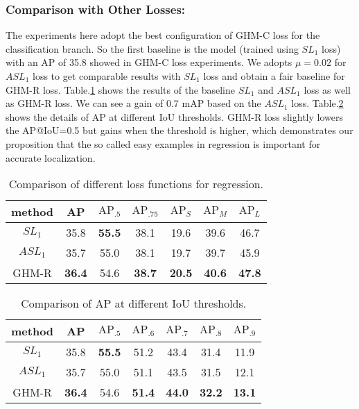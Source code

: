 \documentclass[letterpaper]{article} \usepackage{aaai19}  \usepackage{times}  \usepackage{helvet}  \usepackage{courier}  \usepackage{url}  \usepackage{graphicx}  \usepackage{amsmath,amssymb}
\begin{document}
\subsubsection{Comparison with Other Losses:} The experiments here adopt the best configuration of GHM-C loss for the classification branch. So the first baseline is the model (trained using $SL_1$ loss) with an AP of 35.8 showed in GHM-C loss experiments. We adopts $\mu=0.02$ for $ASL_1$ loss to get comparable results with $SL_1$ loss and obtain a fair baseline for GHM-R loss. Table.\ref{tab:reg1} shows the results of the baseline $SL_1$ and $ASL_1$ loss as well as  GHM-R loss. We can see a gain of 0.7 mAP based on the $ASL_1$ loss. Table.\ref{tab:regthr} shows the details of AP at different IoU thresholds.  GHM-R loss slightly lowers the AP@IoU=0.5 but gains when the threshold is higher, which demonstrates our proposition that the so called easy examples in regression is important for accurate localization.
\begin{table}[!ht]
\begin{center}
\begin{tabular}{| c | c  c  c  c  c  c |}
\hline
method & AP & $\text{AP}_{.5}$ & $\text{AP}_{.75}$ & $\text{AP}_{S}$ & $\text{AP}_{M}$ & $\text{AP}_{L}$ \\
\hline
$SL_1$ & 35.8 & \textbf{55.5} & 38.1 & 19.6 & 39.6 & 46.7 \\
$ASL_1$ & 35.7 & 55.0 & 38.1 & 19.7 & 39.7 & 45.9 \\
GHM-R & \textbf{36.4} & 54.6 & \textbf{38.7} & \textbf{20.5} & \textbf{40.6} & \textbf{47.8} \\
\hline 
\end{tabular}
\caption{Comparison of different loss functions for regression.}
\label{tab:reg1}
\end{center}
\end{table}

\begin{table}[!ht]
\begin{center}
\begin{tabular}{| c | c  c  c  c  c  c |}
\hline
method & AP & $\text{AP}_{.5}$ & $\text{AP}_{.6}$ & $\text{AP}_{.7}$ & $\text{AP}_{.8}$ & $\text{AP}_{.9}$ \\
\hline
$SL_1$ & 35.8 & \textbf{55.5} & 51.2 & 43.4 & 31.4 & 11.9 \\
$ASL_1$ & 35.7 & 55.0 & 51.1 & 43.5 & 31.5 & 12.1 \\
GHM-R & \textbf{36.4} & 54.6 & \textbf{51.4} & \textbf{44.0} & \textbf{32.2} & \textbf{13.1} \\
\hline
\end{tabular}
\caption{Comparison of AP at different IoU thresholds.}
\label{tab:regthr}
\end{center}
\end{table}
\end{document}
